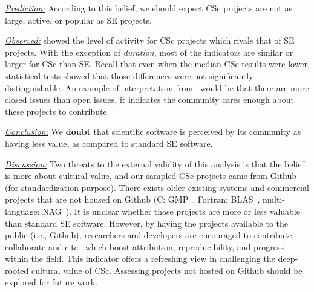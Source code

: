 \documentclass[conference,10pt]{IEEEtran}
\newenvironment{RQ}{\vspace{1mm}\begin{tcolorbox}[enhanced,width=3.4in,size=fbox,colback=red!5!white,drop shadow southeast,sharp corners]}{\end{tcolorbox}}
\begin{document}
\noindent \textit{\underline{Prediction:}} 
According to this belief, we should expect CSc projects are not as large, active, or popular as SE projects.

\noindent \textit{\underline{Observed:}} 
 showed the
level of activity for CSc projects which rivals that of SE projects.
With the exception of {\em duration}, most of the indicators are similar or larger for CSc than SE. Recall that even when the median CSc results were lower, statistical tests showed that those differences were not significantly distinguishable. 
An example of interpretation from~ would be that there are more closed issues than open issues, it indicates the community cares enough about these projects to contribute.

\begin{RQ}
\textit{\underline{Conclusion:}} 
We \textbf{doubt} that scientific software is perceived by its community as having less value, as compared to standard SE software.
\end{RQ}

\noindent \textit{\underline{Discussion:}}
Two threats to the external validity of this analysis is that the belief is more about cultural value,
and our sampled CSc projects came from Github (for standardization purpose). There exists older existing systems and commercial projects that are not housed on Github (C: GMP~\cite{gmp}, Fortran: BLAS~\cite{blas}, multi-language: NAG~\cite{nag}). It is unclear whether those projects are more or less valuable than standard SE software. However, by having 
the projects available to the public (i.e., Github), researchers and developers are encouraged to contribute, collaborate and cite~\cite{Borges_github, borges_github_star} which boost attribution,  reproducibility, and progress within the field. This indicator offers a refreshing view in challenging the deep-rooted cultural value of CSc. Assessing projects not hosted on Github should be explored for future work. \\
\end{document}
